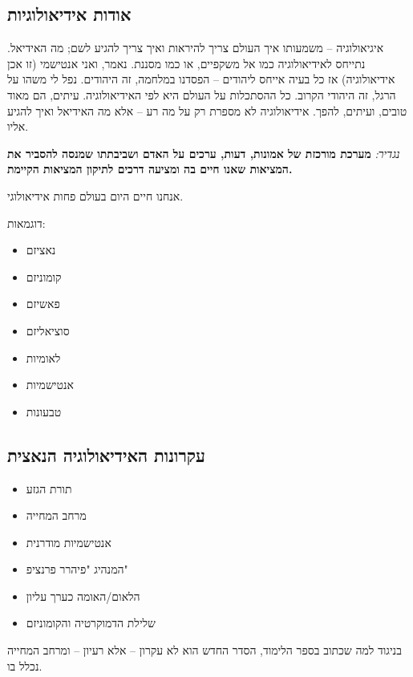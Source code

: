 \documentclass[a4paper]{book}
\begin{document}
	\subsection{אודות אידיאולוגיות}
	איגיאולוגיה – משמעותו איך העולם צריך להיראות ואיך צריך להגיע לשם; מה האידיאל. נתייחס לאידיאולוגיה כמו אל משקפיים, או כמו מסננת. נאמר, ואני אנטישמי (זו אכן אידיאולוגיה) אז כל בעיה אייחס ליהודים – הפסדנו במלחמה, זה היהודים. נפל לי משהו על הרגל, זה היהודי הקרוב. כל ההסתכלות על העולם היא לפי האידיאולוגיה. עיתים, הם מאוד טובים, ועיתים, להפך. אידיאולוגיה לא מספרת רק על מה רע – אלא מה האידיאל ואיך להגיע אליו. 
	
	\textit{נגדיר: }\textbf{מערכת מורכזת של אמונות, דעות, ערכים על האדם ושביבתתו שמנסה להסביר את המציאות שאנו חיים בה ומציעה דרכים לתיקון המציאות הקיימת. }
	
	אנחנו חיים היום בעולם פחות אידיאולוגי. 
	
	דוגמאות: 
	\begin{multicols}{2}
		\begin{itemize}
			\item נאציזם
			\item קומוניזם
			\item פאשיזם
			\item סוציאליזם
			\item לאומיות
			\item אנטישמיות
			\item טבעונות
		\end{itemize}
	\end{multicols}
	
	
	\subsection{עקרונות האידיאולוגיה הנאצית}
	\begin{multicols}{2}
		\begin{itemize}
			\item תורת הגזע
			\item מרחב המחייה
			\item אנטישמיות מודרנית
			\item המנהיג "פיהרר פרנציפ"
			\item הלאום/האומה כערך עליון
			\item שלילת הדמוקרטיה והקומוניזם
		\end{itemize}
	\end{multicols}
	
	בניגוד למה שכתוב בספר הלימוד, הסדר החדש הוא לא עקרון – אלא רעיון – ומרחב המחייה נכלל בו. 
	
\end{document}
